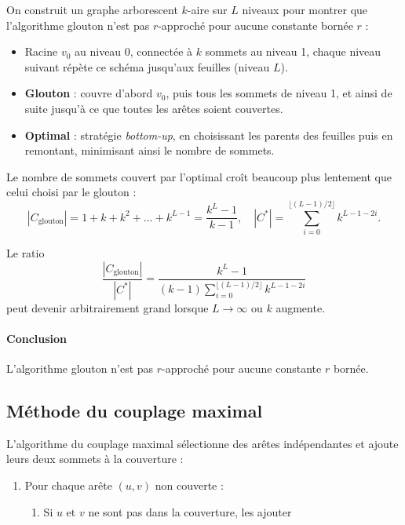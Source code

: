 \documentclass[11pt,a4paper]{article}
\begin{document}
On construit un graphe arborescent $k$-aire sur $L$ niveaux pour montrer que l'algorithme glouton n'est pas $r$-approché pour aucune constante bornée $r$ :

\begin{itemize}
    \item Racine $v_0$ au niveau 0, connectée à $k$ sommets au niveau 1, chaque niveau suivant répète ce schéma jusqu’aux feuilles (niveau $L$).
    \item \textbf{Glouton} : couvre d’abord $v_0$, puis tous les sommets de niveau 1, et ainsi de suite jusqu’à ce que toutes les arêtes soient couvertes.
    \item \textbf{Optimal} : stratégie \emph{bottom-up}, en choisissant les parents des feuilles puis en remontant, minimisant ainsi le nombre de sommets.
\end{itemize}

Le nombre de sommets couvert par l’optimal croît beaucoup plus lentement que celui choisi par le glouton :
\[
|C_{\text{glouton}}| = 1 + k + k^2 + \dots + k^{L-1} = \frac{k^L - 1}{k-1},\quad
|C^*| = \sum_{i=0}^{\lfloor (L-1)/2 \rfloor} k^{L-1-2i}.
\]

Le ratio
\[
\frac{|C_{\text{glouton}}|}{|C^*|} = \frac{k^L - 1}{(k-1)\sum_{i=0}^{\lfloor (L-1)/2 \rfloor} k^{L-1-2i}}
\]
peut devenir arbitrairement grand lorsque $L\to\infty$ ou $k$ augmente.

\paragraph{Conclusion} L’algorithme glouton n’est pas $r$-approché pour aucune constante $r$ bornée.


\subsection{Méthode du couplage maximal}

L'algorithme du couplage maximal sélectionne des arêtes indépendantes et ajoute leurs deux sommets à la couverture :

\begin{enumerate}
    \item Pour chaque arête $(u,v)$ non couverte :
    \begin{enumerate}
        \item Si $u$ et $v$ ne sont pas dans la couverture, les ajouter
    \end{enumerate}
\end{enumerate}
\end{document}
